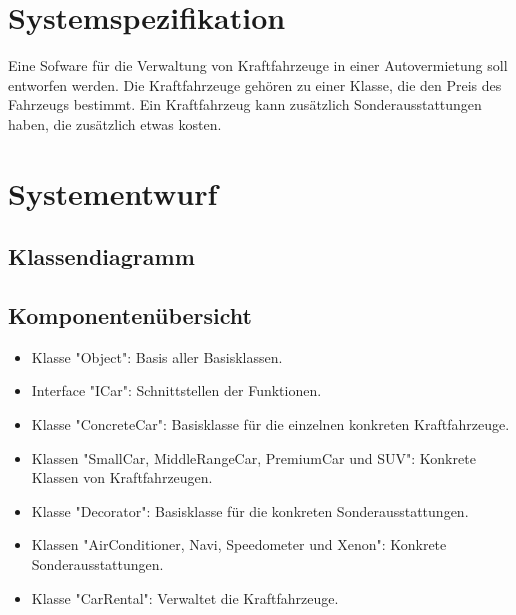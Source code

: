 \documentclass[12pt,a4paper]{article}
\begin{document}
\section{Systemspezifikation}
Eine Sofware für die Verwaltung von Kraftfahrzeuge in einer Autovermietung soll entworfen werden. Die Kraftfahrzeuge gehören zu einer Klasse, die den Preis des Fahrzeugs bestimmt. Ein Kraftfahrzeug kann zusätzlich Sonderausstattungen haben, die zusätzlich etwas kosten.
\\


\newpage
\section {Systementwurf}

\subsection {Klassendiagramm}


\newpage
\subsection {Komponentenübersicht}
\begin {itemize} 
	\item Klasse "Object":
	\newline
	Basis aller Basisklassen.
	
	\item Interface "ICar":
	\newline
	Schnittstellen der Funktionen.

	\item Klasse "ConcreteCar":
	\newline
	Basisklasse für die einzelnen konkreten Kraftfahrzeuge.

	\item Klassen "SmallCar, MiddleRangeCar, PremiumCar und SUV":
	\newline
	Konkrete Klassen von Kraftfahrzeugen.

	\item Klasse "Decorator":
	\newline
	Basisklasse für die konkreten Sonderausstattungen.
	
	\item Klassen "AirConditioner, Navi, Speedometer und Xenon":
	\newline
	Konkrete Sonderausstattungen.

	\item Klasse "CarRental":
	\newline
	Verwaltet die Kraftfahrzeuge.
			
\end {itemize}
\end{document}
